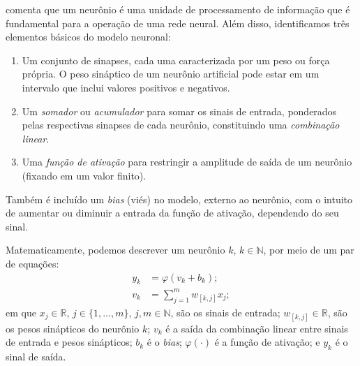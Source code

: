 \documentclass{automatextcc}
\newcommand{\R}{\mathds{R}}
\begin{document}
\citet{haykin2001redesneurais} comenta que um neurônio é uma unidade de processamento de informação que é fundamental para a operação de uma rede neural. Além disso, identificamos três elementos básicos do modelo neuronal:
\begin{enumerate}
    \item Um conjunto de sinapses, cada uma caracterizada por um peso ou força própria. O peso sináptico de um neurônio artificial pode estar em um intervalo que inclui valores positivos e negativos.
    \item Um \textit{somador} ou \textit{acumulador} para somar os sinais de entrada, ponderados pelas respectivas sinapses de cada neurônio, constituindo uma \textit{combinação linear}.
    \item Uma \textit{função de ativação} para restringir a amplitude de saída de um neurônio (fixando em um valor finito).
\end{enumerate}
Também é incluído um \textit{bias} (viés) no modelo, externo ao neurônio, com o intuito de aumentar ou diminuir a entrada da função de ativação, dependendo do seu sinal.

Matematicamente, podemos descrever um neurônio $k$, $k \in \mathds{N}$, por meio de um par de equações:
\begin{align*}
y_k &= \varphi(v_k + b_k);\\[.2cm]
v_k &= \displaystyle{\sum_{j=1}^{m} }w_{[k,j]}x_j;
\end{align*}
em que $x_j \in \R$, $j \in \{1,\dots,m\}$, $j,m \in \mathds{N}$, são os sinais de entrada; $w_{[k,j]} \in \R$, são os pesos sinápticos do neurônio $k$; $v_k$ é a saída da combinação linear entre sinais de entrada e pesos sinápticos; $b_k$ é o \textit{bias}; $\varphi(\cdot)$ é a função de ativação; e $y_k$ é o sinal de saída.


\end{document}
